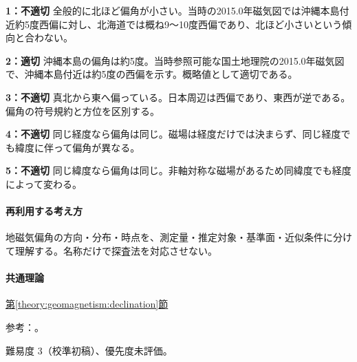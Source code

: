 \noindent\textbf{1：不適切} 全般的に北ほど偏角が小さい。当時の2015.0年磁気図では沖縄本島付近約5度西偏に対し、北海道では概ね9〜10度西偏であり、北ほど小さいという傾向と合わない。\par

\noindent\textbf{2：適切} 沖縄本島の偏角は約5度。当時参照可能な国土地理院の2015.0年磁気図で、沖縄本島付近は約5度の西偏を示す。概略値として適切である。\par

\noindent\textbf{3：不適切} 真北から東へ偏っている。日本周辺は西偏であり、東西が逆である。偏角の符号規約と方位を区別する。\par

\noindent\textbf{4：不適切} 同じ経度なら偏角は同じ。磁場は経度だけでは決まらず、同じ経度でも緯度に伴って偏角が異なる。\par

\noindent\textbf{5：不適切} 同じ緯度なら偏角は同じ。非軸対称な磁場があるため同緯度でも経度によって変わる。\par

\paragraph{再利用する考え方} 地磁気偏角の方向・分布・時点を、測定量・推定対象・基準面・近似条件に分けて理解する。名称だけで探査法を対応させない。

\paragraph{共通理論} \hyperref[theory:geomagnetism:declination]{第\ref*{theory:geomagnetism:declination}節}

\par 参考：\cite{gsi_declination2015}。

\par 難易度 3（校準初稿）、優先度未評価。
